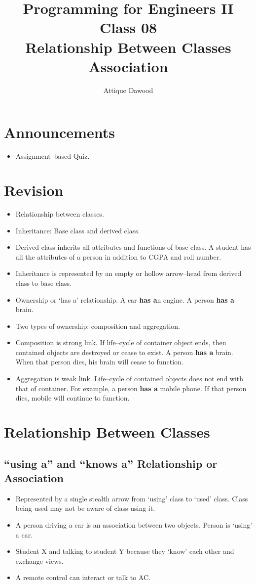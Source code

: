 \documentclass[12pt,a4paper]{article}
\title{\vspace{-2cm}Programming for Engineers II\\Class 08\\Relationship Between Classes\\Association}
\author{Attique Dawood}
\begin{document}
\maketitle
\section{Announcements}
\begin{itemize}
\item Assignment--based Quiz.
\end{itemize}
\section{Revision}
\begin{itemize}
\item Relationship between classes.
\item Inheritance: Base class and derived class.
\item Derived class inherits all attributes and functions of base class. A student has all the attributes of a person in addition to CGPA and roll number.
\item Inheritance is represented by an empty or hollow arrow--head from derived class to base class.
\item Ownership or `has a' relationship. A car \textbf{has a}n engine. A person \textbf{has a} brain.
\item Two types of ownership: composition and aggregation.
\item Composition is strong link. If life--cycle of container object ends, then contained objects are destroyed or cease to exist. A person \textbf{has a} brain. When that person dies, his brain will cease to function.
\item Aggregation is weak link. Life--cycle of contained objects does not end with that of container. For example, a person \textbf{has a} mobile phone. If that person dies, mobile will continue to function.
\end{itemize}
\section{Relationship Between Classes}
\subsection{``using a'' and ``knows a'' Relationship or Association}
\begin{itemize}
\item Represented by a single stealth arrow from `using' class to `used' class. Class being used may not be aware of class using it.
\item A person driving a car is an association between two objects. Person is `using' a car.
\item Student X and talking to student Y because they `know' each other and exchange views.
\item A remote control can interact or talk to AC.
\end{itemize}
\end{document}

